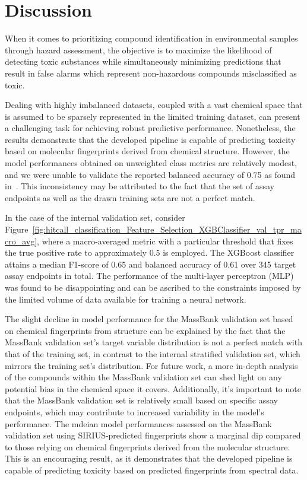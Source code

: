 \chapter{Discussion}\label{chap:discussion}

When it comes to prioritizing compound identification in environmental samples through hazard assessment, the objective is to maximize the likelihood of detecting toxic substances while simultaneously minimizing predictions that result in false alarms which represent non-hazardous compounds misclassified as toxic. 

Dealing with highly imbalanced datasets, coupled with a vast chemical space that is assumed to be sparsely represented in the limited training dataset, can present a challenging task for achieving robust predictive performance. Nonetheless, the results demonstrate that the developed pipeline is capable of predicting toxicity based on molecular fingerprints derived from chemical structure. However, the model performances obtained on unweighted class metrics are relatively modest, and we were unable to validate the reported balanced accuracy of 0.75 as found in~\cite{arturi}. This inconsistency may be attributed to the fact that the set of assay endpoints as well as the drawn training sets are not a perfect match. 

In the case of the internal validation set, consider Figure~\ref{fig:hitcall_classification_Feature_Selection_XGBClassifier_val_tpr_macro_avg}, where a macro-averaged metric with a particular threshold that fixes the true positive rate to approximately 0.5 is employed. The XGBoost classifier attains a median F1-score of 0.65 and balanced accuracy of 0.61 over 345 target assay endpoints in total. The performance of the multi-layer perceptron (MLP) was found to be disappointing and can be ascribed to the constraints imposed by the limited volume of data available for training a neural network.

The slight decline in model performance for the MassBank validation set based on chemical fingerprints from structure can be explained by the fact that the MassBank validation set's target variable distribution is not a perfect match with that of the training set, in contrast to the internal stratified validation set, which mirrors the training set's distribution. For future work, a more in-depth analysis of the compounds within the MassBank validation set can shed light on any potential bias in the chemical space it covers. Additionally, it's important to note that the MassBank validation set is relatively small based on specific assay endpoints, which may contribute to increased variability in the model's performance. The mdeian model performances assessed on the MassBank validation set using SIRIUS-predicted fingerprints show a marginal dip compared to those relying on chemical fingerprints derived from the molecular structure. This is an encouraging result, as it demonstrates that the developed pipeline is capable of predicting toxicity based on predicted fingerprints from spectral data.

